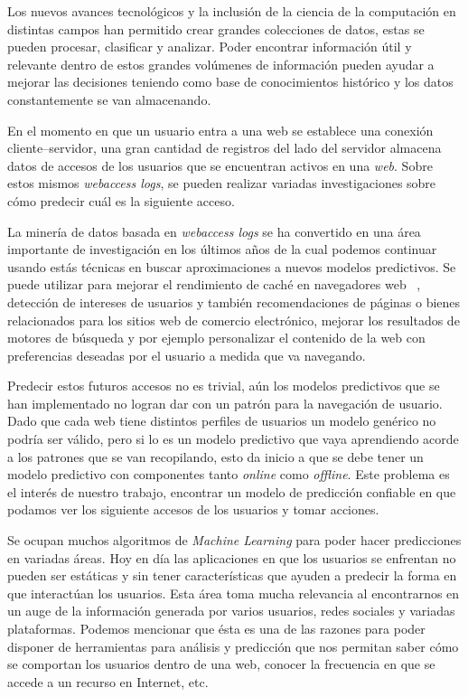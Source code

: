 {
Los nuevos avances tecnológicos y la inclusión de la ciencia de la computación en distintas campos han permitido crear grandes colecciones de datos, estas se pueden procesar, clasificar y analizar. Poder encontrar información útil y relevante dentro de estos grandes volúmenes de información pueden ayudar a mejorar las decisiones teniendo como base de conocimientos histórico y los datos constantemente se van almacenando.

En el momento en que un usuario entra a una web se establece una conexión cliente--servidor, una gran cantidad de registros del lado del servidor almacena datos de accesos de los usuarios que se encuentran activos en una \emph{web}. Sobre estos mismos \emph{webaccess logs}, se pueden realizar variadas investigaciones sobre cómo predecir cuál es la siguiente acceso. 

La minería de datos basada en \emph{webaccess logs} se ha convertido en una área importante de investigación en los últimos años de la cual podemos continuar usando estás técnicas en buscar aproximaciones a nuevos modelos predictivos. Se puede utilizar para mejorar el rendimiento de caché en navegadores web \etal~\cite{Moghaddam2009},  detección de intereses de usuarios y también recomendaciones de páginas o bienes relacionados para los sitios web de comercio electrónico, mejorar los resultados de motores de búsqueda y por ejemplo personalizar el contenido de la web con preferencias deseadas por el usuario a medida que va navegando.

Predecir estos futuros accesos no es trivial, aún los modelos predictivos que se han implementado no logran dar con un patrón para la navegación de usuario. Dado que cada web tiene distintos perfiles de usuarios un modelo genérico no podría ser válido, pero si lo es un modelo predictivo que vaya aprendiendo acorde a los patrones que se van recopilando, esto da inicio a que se debe tener un modelo predictivo con componentes tanto \emph{online} como \emph{offline}. Este problema es el interés de nuestro trabajo, encontrar un modelo de predicción confiable en que podamos ver los siguiente accesos de los usuarios y tomar acciones. 

Se ocupan muchos algoritmos de \emph{Machine Learning} para poder hacer predicciones en variadas áreas. Hoy en día las aplicaciones en que los usuarios se enfrentan no pueden ser estáticas y sin tener características que ayuden a predecir la forma en que interactúan los usuarios. Esta área toma mucha relevancia al encontrarnos en un auge de la información generada por varios usuarios, redes sociales y variadas plataformas. Podemos mencionar que ésta es una de las razones para poder disponer de herramientas para análisis y predicción que nos permitan saber cómo se comportan los usuarios dentro de una web, conocer la frecuencia en que se accede a un recurso en Internet, etc. 

}
